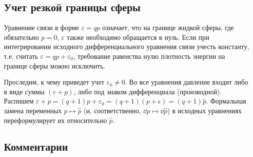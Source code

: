 \documentclass[\docroot/reports/draft/report.tex]{subfiles}
\begin{document}
\subsection{Учет резкой границы сферы}

    Уравнение связи в форме $\varepsilon = q p$ означает, что на границе жидкой сферы, где обязательно $p = 0$, $\varepsilon$ также необходимо обращается в нуль. Если при интегрировании исходного дифференциального уравнения связи учесть константу, т.е. считать $\varepsilon = q p + \varepsilon_0$, требование равенства нулю плотность энергии на границе сферы можно исключить.

    Проследим, к чему приведет учет $\varepsilon_0 \neq 0$. Во все уравнения давление входит либо в виде суммы $(\varepsilon + p)$, либо под знаком дифференциала (производной). Распишем $\varepsilon + p = (q + 1) p + \varepsilon_0 = (q + 1) (p + \epsilon) = (q + 1) \hat{p}$. Формальная замена переменных $p \mapsto \hat{p}$ (и, соответственно, $\dd{p} \mapsto \dd{\hat{p}}$) в исходных уравнениях переформулирует их относительно $\hat{p}$.

\subsection{Комментарии}
\end{document}
